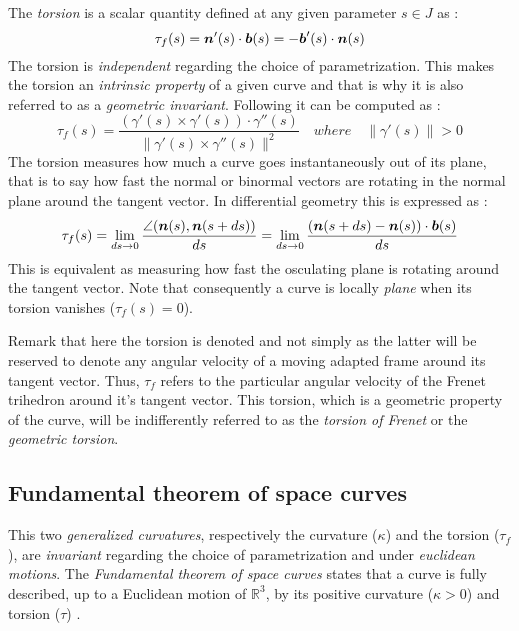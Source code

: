 The \emph{torsion} is a scalar quantity defined at any given parameter $s \in J$ as :
\begin{equation}
	\tau_f(s) = \boldsymbol{n}'(s) \cdot \boldsymbol{b}(s) = - \boldsymbol{b}'(s) \cdot \boldsymbol{n}(s)
\end{equation}
The torsion is \emph{independent} regarding the choice of parametrization. This makes the torsion an \emph{intrinsic property} of a given curve and that is why it is also referred to as a \emph{geometric invariant}. Following \cite[p.204]{Gray2006} it can be computed as :
\begin{equation}
	\tau_f(s) = \frac{(\gamma'(s) \times \gamma'(s)) \cdot \gamma''(s)}{\|\gamma'(s) \times \gamma''(s)\|^2}
	\quad where \quad
	\|\gamma'(s)\| > 0
\end{equation}
The torsion measures how much a curve goes instantaneously out of its plane, that is to say how fast the normal or binormal vectors are rotating in the normal plane around the tangent vector. In differential geometry this is expressed as :
\begin{equation}
	\tau_f(s) 
	= \lim_{ds \to 0}\frac{\angle(\boldsymbol{n}(s),\boldsymbol{n}(s+ds))}{ds}
	= \lim_{ds \to 0}\frac{(\boldsymbol{n}(s+ds) - \boldsymbol{n}(s)) \cdot \boldsymbol{b}(s)}{ds}
\end{equation}
This is equivalent as measuring how fast the osculating plane is rotating around the tangent vector. Note that consequently a curve is locally \emph{plane} when its torsion vanishes ($\tau_f(s) = 0$).

Remark that here the torsion is denoted  and not simply \textquote{$\tau$} as the latter will be reserved to denote any angular velocity of a moving adapted frame around its tangent vector. Thus, $\tau_f$ refers to the particular angular velocity of the Frenet trihedron around it's tangent vector. This torsion, which is a geometric property of the curve, will be indifferently referred to as the \emph{torsion of Frenet} or the \emph{geometric torsion}.

\subsection{Fundamental theorem of space curves}
This two \emph{generalized curvatures}, respectively the curvature ($\kappa$) and the torsion ($\tau_f$), are \emph{invariant} regarding the choice of parametrization and under \emph{euclidean motions}. The \emph{Fundamental theorem of space curves} states that a curve is fully described, up to a Euclidean motion of ${\mathbb{R}}^3$, by its positive curvature ($\kappa > 0$) and torsion ($\tau$) \cite[p.229]{Gray2006}.

